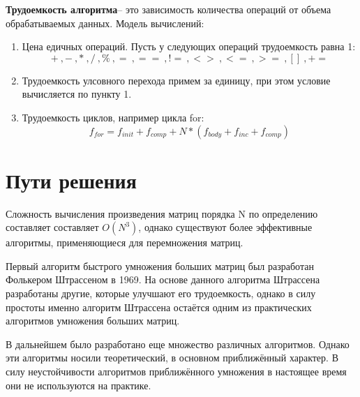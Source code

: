 \textbf{Трудоемкость алгоритма}-- это зависимость количества операций от объема обрабатываемых данных.
Модель вычислений:
\begin{enumerate}
\item Цена едичных операций. Пусть у следующих операций трудоемкость равна 1:
$$+~,-~,*~,/~,\%~,=~,==~,!=~,<>~,<=~,>=~,[]~,+=$$
\item Трудоемкость улсовного перехода примем за единицу, при этом условие вычисляется по пункту 1. 
\item Трудоемкость циклов, например цикла for:
$$f_{for} = f_{init}+f_{comp}+N*(f_{body}+f_{inc}+f_{comp})$$
\end{enumerate}


\section{Пути решения}
\hfill

Сложность вычисления произведения матриц порядка N по определению составляет составляет $O(N^3)$, однако существуют более эффективные алгоритмы, применяющиеся для перемножения матриц. 

Первый алгоритм быстрого умножения больших матриц был разработан Фолькером Штрассеном в 1969. На основе данного алгоритма Штрассена разработаны другие, которые улучшают его трудоемкость, однако в силу простоты  именно алгоритм Штрассена остаётся одним из практических алгоритмов умножения больших матриц. 

В дальнейшем было разработано еще множество различных алгоритмов. Однако эти алгоритмы носили теоретический, в основном приближённый характер. В силу неустойчивости алгоритмов приближённого умножения в настоящее время они не используются на практике.

